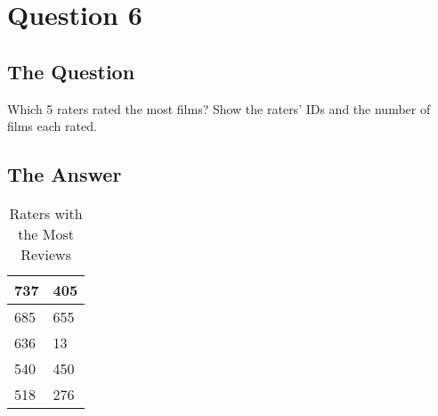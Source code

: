 \section{Question 6}

\subsection{The Question}

\begin{flushleft}

Which 5 raters rated the most films? Show the raters' IDs and
the number of films each rated.

\end{flushleft}
\subsection{The Answer}


\begin{flushleft}


\begin{table}[h]
\centering
\begin{tabular}{ll}
737 & 405 \\ \hline
685 & 655 \\ \hline
636 & 13  \\ \hline
540 & 450 \\ \hline
518 & 276
\end{tabular}
\caption{Raters with the Most Reviews}
\end{table}


\end{flushleft}




